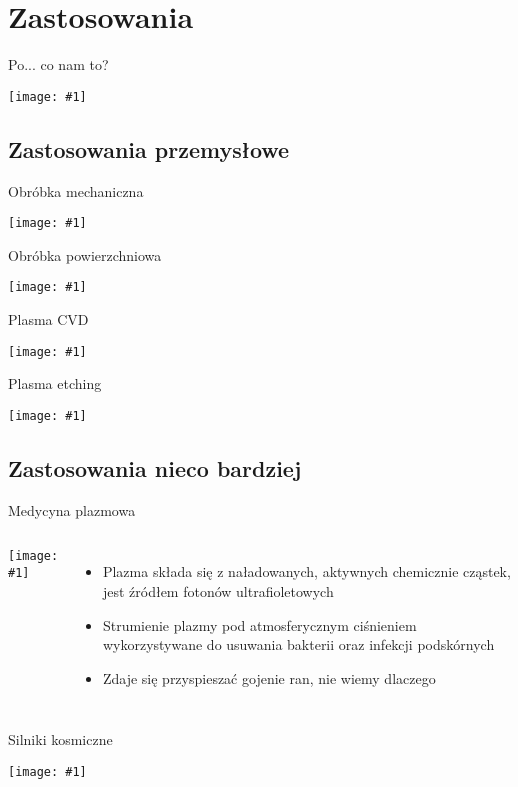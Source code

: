 \documentclass{beamer}
\newcommand {\framedgraphic}[1] {
        \begin{center}
            \texttt{[image: \#1]}
        \end{center}
}
\begin{document}
\section{Zastosowania}
\begin{frame}[t]{Po... co nam to?}
  \framedgraphic{img/nachujmilas.jpg}
\end{frame}

\subsection{Zastosowania przemysłowe}
\begin{frame}[t]{Obróbka mechaniczna}
  \framedgraphic{img/plasmacutter}
\end{frame}
\begin{frame}[t]{Obróbka powierzchniowa}
  \framedgraphic{img/Plasma_Spraying_Process}
\end{frame}

\begin{frame}[t]{Plasma CVD}
  \framedgraphic{img/pcvd}
\end{frame}

\begin{frame}[t]{Plasma etching}
  \framedgraphic{img/plasmaetching.png}
\end{frame}

\subsection{Zastosowania nieco bardziej}
\begin{frame}[t]{Medycyna plazmowa}
  \begin{columns}[c]
    \framedgraphic{img/coldplasmamedicine}
    \begin{itemize}[<+->]
      \item Plazma składa się z naładowanych, aktywnych chemicznie cząstek, jest
      źródłem fotonów ultrafioletowych
      \item Strumienie plazmy pod atmosferycznym ciśnieniem wykorzystywane do
      usuwania bakterii oraz infekcji podskórnych
      \item Zdaje się przyspieszać gojenie ran, nie wiemy dlaczego
    \end{itemize}
  \end{columns}
\end{frame}

\begin{frame}[t]{Silniki kosmiczne}
  \framedgraphic{img/Xenon_hall_thruster}
\end{frame}
\end{document}
